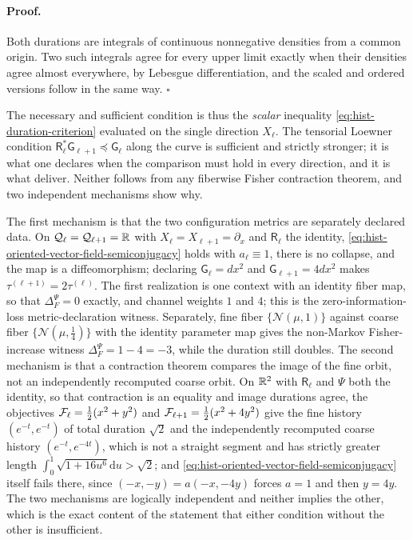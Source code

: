 \paragraph{Proof.}
Both durations are integrals of continuous nonnegative densities from a common
origin.  Two such integrals agree for every upper limit exactly when their
densities agree almost everywhere, by Lebesgue differentiation, and the scaled
and ordered versions follow in the same way.  $\square$

The necessary and sufficient condition is thus the \emph{scalar} inequality
\eqref{eq:hist-duration-criterion} evaluated on the single direction $X_\ell$.
The tensorial Loewner condition
$\mathsf R_\ell^*\mathsf G_{\ell+1}\preceq\mathsf G_\ell$ along the curve is
sufficient and strictly stronger; it is what one declares when the comparison
must hold in every direction, and it is what
 deliver.
Neither follows from any fiberwise Fisher contraction theorem, and two
independent mechanisms show why.  

The first mechanism is that the two configuration metrics are separately
declared data.  On $\mathcal Q_\ell=\mathcal Q_{\ell+1}=\mathbb R$ with
$X_\ell=X_{\ell+1}=\partial_x$ and $\mathsf R_\ell$ the identity,
\eqref{eq:hist-oriented-vector-field-semiconjugacy} holds with $a_\ell\equiv1$,
there is no collapse, and the map is a diffeomorphism; declaring
$\mathsf G_\ell=dx^2$ and $\mathsf G_{\ell+1}=4dx^2$ makes
$\tau^{(\ell+1)}=2\tau^{(\ell)}$.  The first realization is one context with
an identity fiber map, so that $\Delta_F^\Psi=0$ exactly, and channel weights
$1$ and $4$; this is the zero-information-loss metric-declaration witness.
Separately, fine fiber $\{\mathcal N(\mu,1)\}$ against coarse fiber
$\{\mathcal N(\mu,\tfrac14)\}$ with the identity parameter map gives the
non-Markov Fisher-increase witness $\Delta_F^\Psi=1-4=-3$, while the duration
still doubles.  The second mechanism is that a contraction theorem compares the
image of the fine orbit, not an independently recomputed coarse orbit.  On
$\mathbb R^2$ with $\mathsf R_\ell$ and $\Psi$ both the identity, so that contraction
is an equality and image durations agree, the objectives
$\mathcal F_\ell=\tfrac12(x^2+y^2)$ and
$\mathcal F_{\ell+1}=\tfrac12(x^2+4y^2)$ give the fine history
$(e^{-t},e^{-t})$ of total duration $\sqrt2$ and the independently recomputed
coarse history $(e^{-t},e^{-4t})$, which is not a straight segment and has
strictly greater length
$\int_0^1\sqrt{1+16u^6}\mathrm{d}u>\sqrt2$; and
\eqref{eq:hist-oriented-vector-field-semiconjugacy} itself fails there, since
$(-x,-y)=a(-x,-4y)$ forces $a=1$ and then $y=4y$.  The two mechanisms are
logically independent and neither implies the other, which is the exact content
of the statement that either condition without the other is insufficient.

